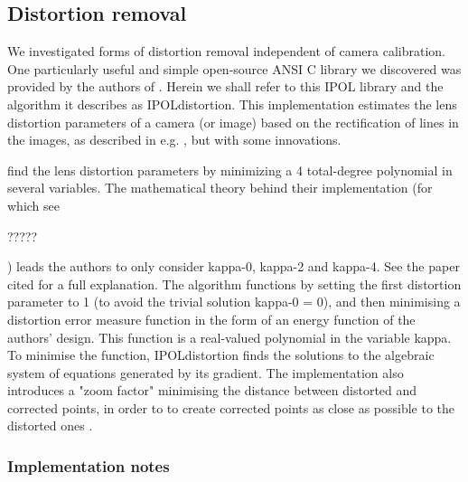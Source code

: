 
\subsection{Distortion removal}



We investigated forms of distortion removal independent of camera calibration. One particularly useful and simple open-source ANSI C library we discovered was provided by the authors of \cite{algebraic-distortion}. Herein we shall refer to this IPOL library and the algorithm it describes as IPOLdistortion. This implementation estimates the lens distortion parameters of a camera (or image) based on the rectification of lines in the images, as described in e.g. \cite{straightlines}, but with some innovations.

\cite{algebraic-distortion} find the lens distortion parameters by minimizing a 4 total-degree polynomial in several variables. The mathematical theory behind their implementation (for which see 

?????

) leads the authors to only consider kappa-0, kappa-2 and kappa-4. See the paper cited for a full explanation. The algorithm functions by setting the first distortion parameter to 1 (to avoid the trivial solution kappa-0 = 0), and then minimising a distortion error measure function in the form of an energy function of the authors' design. This function is a real-valued polynomial in the variable kappa. To minimise the function, IPOLdistortion finds the solutions to the algebraic system of equations generated by its gradient. The implementation also introduces a "zoom factor" minimising the distance between distorted and corrected points, in order to to create corrected points as close as possible to the distorted ones \cite{algebraic-distortion}.

\subsubsection{Implementation notes}

